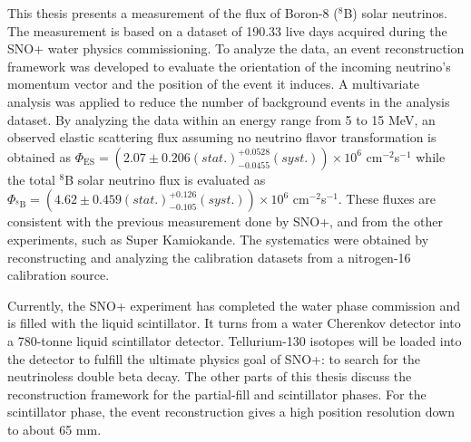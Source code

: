 \begin{doublespacing}
This thesis presents a measurement of the flux of Boron-8 ($^8$B) solar neutrinos. The measurement is based on a dataset of 190.33 live days acquired during the SNO+ water physics commissioning. To analyze the data, an event reconstruction framework was developed to evaluate the orientation of the incoming neutrino's momentum vector and the position of the event it induces. A multivariate analysis was applied to reduce the number of background events in the analysis dataset. By analyzing the data within an energy range from 5 to 15 MeV, an observed elastic scattering flux assuming no neutrino flavor transformation is obtained as $\Phi_{\mathrm{ES}}=(2.07 \pm 0.206 (stat.)^{+0.0528}_{-0.0455}(syst.))\times10^6$ cm$^{-2}$s$^{-1}$ while the total $^8$B solar neutrino flux is evaluated as $\Phi_{\mathrm{^8B}}=(4.62 \pm 0.459 (stat.)^{+0.126}_{-0.105}(syst.))\times10^6$ cm$^{-2}$s$^{-1}$. These fluxes are consistent with the previous measurement done by SNO+\cite{anderson2019measurement}, and from the other experiments, such as Super Kamiokande\cite{abe2016solar}. The systematics were obtained by reconstructing and analyzing the calibration datasets from a nitrogen-16 calibration source.

Currently, the SNO+ experiment has completed the water phase commission and is filled with the liquid scintillator. It turns from a water Cherenkov detector into a 780-tonne liquid scintillator detector. Tellurium-130 isotopes will be loaded into the detector to fulfill the ultimate physics goal of SNO+: to search for the neutrinoless double beta decay. The other parts of this thesis discuss the reconstruction framework for the partial-fill and scintillator phases. For the scintillator phase, the event reconstruction gives a high position resolution down to about 65 mm. %

\end{doublespacing}
